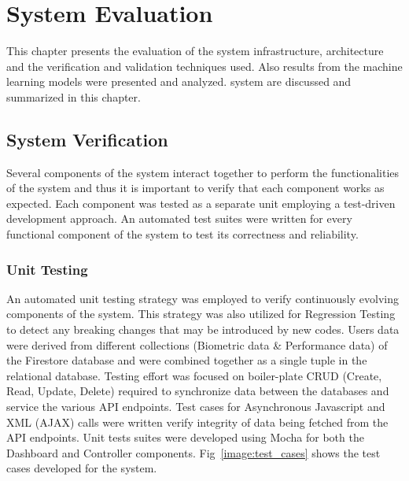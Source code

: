 \chapter{System Evaluation}
This chapter presents the evaluation of the system infrastructure, architecture and the verification and validation techniques used. Also results from the machine 
learning models were presented and analyzed. 
system are discussed and summarized in this chapter. 

\section{System Verification}
Several components of the system interact together to perform the functionalities of the system and thus it is important to verify that each component works as 
expected. Each component was tested as a separate unit employing a test-driven development approach. An automated test suites were written for every functional component
of the system to test its correctness and reliability.
\subsection{Unit Testing}
An automated unit testing strategy was employed to verify continuously evolving components of the system. This strategy was also utilized for Regression Testing
to detect any breaking changes that may be introduced by new codes.
Users data were derived from different collections (Biometric data \& Performance data) of the Firestore database and were combined together as a single tuple in the 
relational database.  Testing effort was focused on boiler-plate CRUD (Create, Read, Update, Delete) required to synchronize data between the databases and service 
the various API endpoints. Test cases for Asynchronous Javascript and XML (AJAX) calls were written verify integrity of data being fetched from the API endpoints. 
Unit tests suites were developed using Mocha for both the Dashboard and Controller components. Fig~\ref{image:test_cases} shows the test cases developed for the 
system. 

